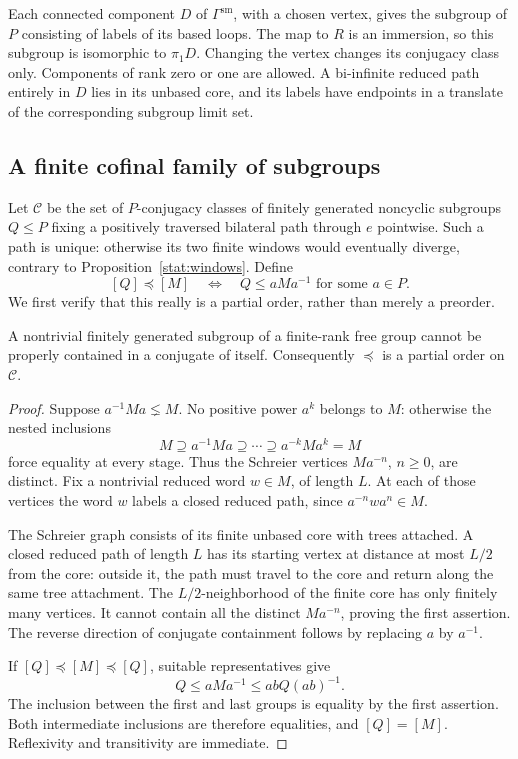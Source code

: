 Each connected component $D$ of $\Gamma^{\mathrm{sm}}$, with a
chosen vertex, gives the subgroup of $P$ consisting of labels of
its based loops.  The map to $R$ is an immersion, so this subgroup
is isomorphic to $\pi_1D$.  Changing the vertex changes its
conjugacy class only.  Components of rank zero or one are allowed.
A bi-infinite reduced path entirely in $D$ lies in its unbased core,
and its labels have endpoints in a translate of the corresponding
subgroup limit set.

\subsection{A finite cofinal family of subgroups}

Let $\mathcal C$ be the set of $P$-conjugacy classes of finitely
generated noncyclic subgroups $Q\le P$ fixing a positively traversed
bilateral path through $e$ pointwise.  Such a path is unique: otherwise its
two finite windows would eventually diverge, contrary to
Proposition~\ref{stat:windows}.  Define
\[
 [Q]\preceq[M]
 \quad\Longleftrightarrow\quad
 Q\le aMa^{-1}\text{ for some }a\in P.
\]
We first verify that this really is a partial order, rather than
merely a preorder.

\begin{lemma}
\label{car:conjugate-containment}
A nontrivial finitely generated subgroup of a finite-rank free group
cannot be properly contained in a conjugate of itself.  Consequently
$\preceq$ is a partial order on $\mathcal C$.
\end{lemma}

\begin{proof}
Suppose $a^{-1}Ma\lneq M$.  No positive power $a^k$ belongs to $M$:
otherwise the nested inclusions
\[
 M\supseteq a^{-1}Ma\supseteq\cdots
 \supseteq a^{-k}Ma^k=M
\]
force equality at every stage.  Thus the Schreier vertices
$Ma^{-n}$, $n\ge0$, are distinct.  Fix a nontrivial reduced word
$w\in M$, of length $L$.  At each of those vertices the word $w$
labels a closed reduced path, since $a^{-n}wa^n\in M$.

The Schreier graph consists of its finite unbased core with trees
attached.  A closed reduced path of length $L$ has its starting
vertex at distance at most $L/2$ from the core: outside it, the
path must travel to the core and return along the same tree
attachment.  The $L/2$-neighborhood of the finite core has only
finitely many vertices.  It cannot contain all the distinct
$Ma^{-n}$, proving the first assertion.  The reverse direction of
conjugate containment follows by replacing $a$ by $a^{-1}$.

If $[Q]\preceq[M]\preceq[Q]$, suitable representatives give
\[
 Q\le aMa^{-1}\le abQ(ab)^{-1}.
\]
The inclusion between the first and last groups is equality by the
first assertion.  Both intermediate inclusions are therefore
equalities, and $[Q]=[M]$.  Reflexivity and transitivity are immediate.
\end{proof}

